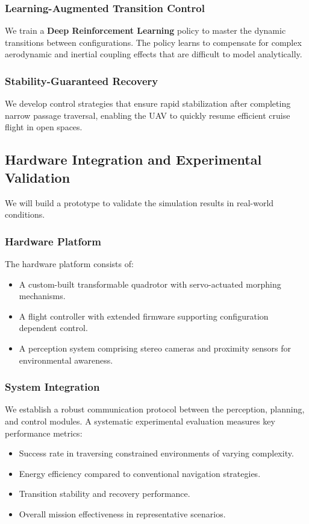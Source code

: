 \documentclass[11pt,a4paper]{article}
\begin{document}
\subsubsection{Learning-Augmented Transition Control}
We train a \textbf{Deep Reinforcement Learning} policy to master the dynamic transitions between configurations. The policy learns to compensate for complex aerodynamic and inertial coupling effects that are difficult to model analytically.

\subsubsection{Stability-Guaranteed Recovery}
We develop control strategies that ensure rapid stabilization after completing narrow passage traversal, enabling the UAV to quickly resume efficient cruise flight in open spaces.

\subsection{Hardware Integration and Experimental Validation}
We will build a prototype to validate the simulation results in real-world conditions.

\subsubsection{Hardware Platform}
The hardware platform consists of:
\begin{itemize}
    \item A custom-built transformable quadrotor with servo-actuated morphing mechanisms.
    \item A flight controller with extended firmware supporting configuration dependent control.
    \item A perception system comprising stereo cameras and proximity sensors for environmental awareness.
\end{itemize}

\subsubsection{System Integration}
We establish a robust communication protocol between the perception, planning, and control modules. A systematic experimental evaluation measures key performance metrics:
\begin{itemize}
    \item Success rate in traversing constrained environments of varying complexity.
    \item Energy efficiency compared to conventional navigation strategies.
    \item Transition stability and recovery performance.
    \item Overall mission effectiveness in representative scenarios.
\end{itemize}
\end{document}
